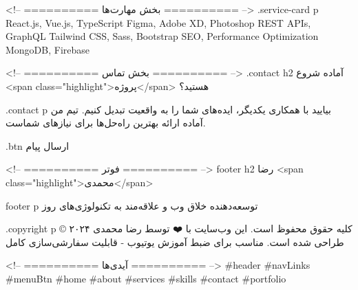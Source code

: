 <!-- ========== بخش مهارت‌ها ========== -->
.service-card p
React.js, Vue.js, TypeScript
Figma, Adobe XD, Photoshop
REST APIs, GraphQL
Tailwind CSS, Sass, Bootstrap
SEO, Performance Optimization
MongoDB, Firebase

<!-- ========== بخش تماس ========== -->
.contact h2
آماده شروع <span class="highlight">پروژه</span> هستید؟

.contact p
بیایید با همکاری یکدیگر، ایده‌های شما را به واقعیت تبدیل کنیم. تیم من آماده ارائه بهترین راه‌حل‌ها برای نیازهای شماست.

.btn
ارسال پیام

<!-- ========== فوتر ========== -->
footer h2
رضا <span class="highlight">محمدی</span>

footer p
توسعه‌دهنده خلاق وب و علاقه‌مند به تکنولوژی‌های روز

.copyright p
© ۲۰۲۴ کلیه حقوق محفوظ است. این وب‌سایت با ❤️ توسط رضا محمدی طراحی شده است.
مناسب برای ضبط آموزش یوتیوب - قابلیت سفارشی‌سازی کامل

<!-- ========== آیدی‌ها ========== -->
#header
#navLinks
#menuBtn
#home
#about
#services
#skills
#contact
#portfolio